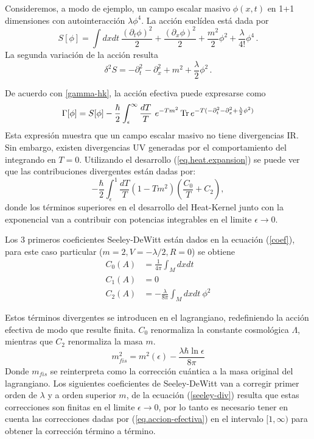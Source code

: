 Consideremos, a modo de ejemplo, un campo escalar masivo $\phi(x,t)$ en 1+1 dimensiones con autointeracción $\lambda \phi ^4 $. La acción euclídea está dada por
\begin{equation}
S[ \phi ] = \int dx dt \ 
\frac{( \partial _t \phi ) ^2}{2} +  
\frac{( \partial _x \phi ) ^2}{2} +
\frac{m ^2 }{2} \phi ^2 +
\frac{\lambda}{4!} \phi ^4 \,.
\end{equation}
La segunda variación de la acción resulta
\begin{equation}
\delta ^2 S = 
- \partial _t ^2 
- \partial _x ^2 
+ m ^2 
+ \frac{\lambda}{2}\phi ^2 \,.
\end{equation}


De acuerdo con \eqref{gamma-hk}, la acción efectiva puede expresarse como
\begin{equation}\label{eq.accion-efectiva}
\Gamma [ \phi ] = 
S[ \phi ] - 
\frac{\hbar }{2}
\int _ { \epsilon } ^{\infty} \frac{ dT}{T} 
\ e ^{- T m ^2 }
\,{\rm Tr} \,  e ^{- T ( - \partial _t ^2 - \partial _x ^2 + \frac{\lambda}{2} \phi ^2 ) }
\end{equation}
Esta expresión muestra que un campo escalar masivo no tiene divergencias IR. Sin embargo, existen divergencias UV generadas por el comportamiento del integrando en $T=0$. Utilizando el desarrollo (\ref{eq.heat.expansion}) se puede ver que las contribuciones divergentes están dadas por:
\begin{equation}\label{seeley-div}
- \frac{\hbar }{2}\int _ { \epsilon } ^{1}  
\frac{ dT}{T} 
\left(
		1 - T m^2
		\right)
\left(
		\frac{C _0}{T} + C _2 
		\right),
\end{equation}
donde los términos superiores en el  desarrollo del Heat-Kernel junto con la exponencial van a contribuir con potencias integrables en el limite $\epsilon \rightarrow 0 $.

Los 3 primeros coeficientes Seeley-DeWitt están dados en la ecuación (\ref{coef}), para este caso particular ($m=2, V = - \lambda /2,R=0$) se obtiene
\begin{align}
C _0 (A) &= \frac{1}{4 \pi   }  \int  _{M} d x dt   \\[2mm]
C _1 (A) &= 0 \\[2mm]
C _2 (A) &= - \frac{ \lambda }{8 \pi }  \int _M d x dt \  \phi ^2
\label{coef2}
\end{align} 


Estos términos divergentes se introducen en el lagrangiano, redefiniendo la acción efectiva de modo que resulte finita. $C_0$ renormaliza la constante cosmológica $\Lambda$, mientras que  $C_2$ renormaliza la masa $m$.
\begin{equation}
m ^2 _{fis} = m ^2 ( \epsilon )  - \frac{\lambda \hbar \ln \epsilon}{8 \pi}
\end{equation}
Donde $m _{fis}$ se reinterpreta como la corrección cuántica a la masa original del lagrangiano. Los siguientes coeficientes de  Seeley-DeWitt van a corregir primer orden de $\lambda$ y a orden superior $m$, de la ecuación (\ref{seeley-div}) resulta que estas correcciones son finitas en el limite $\epsilon \rightarrow 0$, por lo tanto es necesario tener en cuenta las correcciones dadas por (\ref{eq.accion-efectiva}) en el intervalo $[1, \infty)$ para obtener la corrección término a término.
